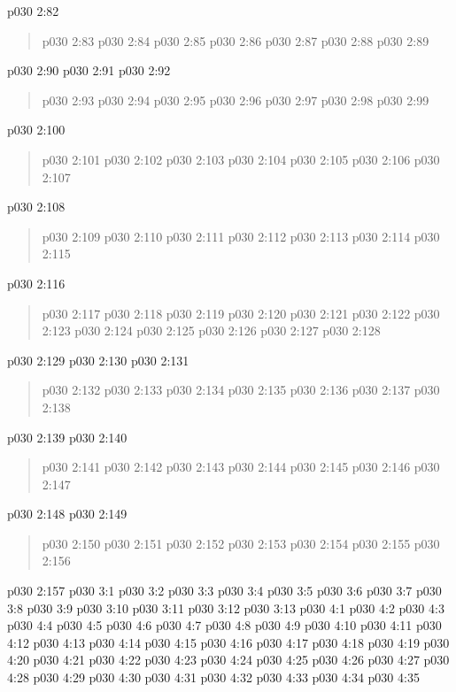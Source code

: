 \vsetspace
\vs p030 2:82 
\begin{quote}
\vs p030 2:83 
\vs p030 2:84 
\vs p030 2:85 
\vs p030 2:86 
\vs p030 2:87 
\vs p030 2:88 
\vs p030 2:89 
\end{quote}
\vsetspace
\vs p030 2:90 
\vsetspace
\vs p030 2:91 
\vsetspace
\vs p030 2:92 
\begin{quote}
\vs p030 2:93 
\vs p030 2:94 
\vs p030 2:95 
\vs p030 2:96 
\vs p030 2:97 
\vs p030 2:98 
\vs p030 2:99 
\end{quote}
\vsetspace
\vs p030 2:100 
\begin{quote}
\vs p030 2:101 
\vs p030 2:102 
\vs p030 2:103 
\vs p030 2:104 
\vs p030 2:105 
\vs p030 2:106 
\vs p030 2:107 
\end{quote}
\vsetspace
\vs p030 2:108 
\begin{quote}
\vs p030 2:109 
\vs p030 2:110 
\vs p030 2:111 
\vs p030 2:112 
\vs p030 2:113 
\vs p030 2:114 
\vs p030 2:115 
\end{quote}
\vsetspace
\vs p030 2:116 
\begin{quote}
\vs p030 2:117 
\vs p030 2:118 
\vs p030 2:119 
\vs p030 2:120 
\vs p030 2:121 
\vs p030 2:122 
\vs p030 2:123 
\vs p030 2:124 
\vs p030 2:125 
\vs p030 2:126 
\vs p030 2:127 
\vs p030 2:128 
\end{quote}
\vs p030 2:129 \pc 
\vsetspace
\vs p030 2:130 \pc 
\vsetspace
\vs p030 2:131 
\begin{quote}
\vs p030 2:132 
\vs p030 2:133 
\vs p030 2:134 
\vs p030 2:135 
\vs p030 2:136 
\vs p030 2:137 
\vs p030 2:138 
\end{quote}
\vs p030 2:139 \pc 
\vsetspace
\vs p030 2:140 
\begin{quote}
\vs p030 2:141 
\vs p030 2:142 
\vs p030 2:143 
\vs p030 2:144 
\vs p030 2:145 
\vs p030 2:146 
\vs p030 2:147 
\end{quote}
\vs p030 2:148 \pc 
\vsetspace
\vs p030 2:149 
\begin{quote}
\vs p030 2:150 
\vs p030 2:151 
\vs p030 2:152 
\vs p030 2:153 
\vs p030 2:154 
\vs p030 2:155 
\vs p030 2:156 
\end{quote}
\vs p030 2:157 \pc 
{}
\vs p030 3:1 
\vs p030 3:2 
\vs p030 3:3 
\vs p030 3:4 
\vs p030 3:5 
\vs p030 3:6 
\vs p030 3:7 
\vs p030 3:8 
\vs p030 3:9 
\vs p030 3:10 
\vs p030 3:11 
\vs p030 3:12 
\vs p030 3:13 
\vs p030 4:1 
\vs p030 4:2 
\vs p030 4:3 
\vs p030 4:4 
\vs p030 4:5 
\vs p030 4:6 
\vs p030 4:7 
\vs p030 4:8 
\vs p030 4:9 \pc 
\vs p030 4:10 
\vs p030 4:11 
\vs p030 4:12 
\vs p030 4:13 
\vs p030 4:14 
\vs p030 4:15 
\vs p030 4:16 \pc 
\vs p030 4:17 
\vs p030 4:18 
\vs p030 4:19 
\vs p030 4:20 
\vs p030 4:21 
\vs p030 4:22 
\vs p030 4:23 
\vs p030 4:24 
\vs p030 4:25 
\vs p030 4:26 
\vs p030 4:27 
\vs p030 4:28 
\vs p030 4:29 
\vs p030 4:30 
\vs p030 4:31 
\vs p030 4:32 
\vs p030 4:33 
\vs p030 4:34 \pc 
\vsetoff
\vs p030 4:35 
\quizlink
